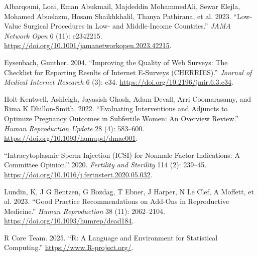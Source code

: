 \documentclass[
  letterpaper,
  DIV=11,
  numbers=noendperiod]{scrartcl}
\newlength{\cslhangindent}
\newenvironment{CSLReferences}[2] %
 {\begin{list}{}{%
  \setlength{\itemindent}{0pt}
  \setlength{\leftmargin}{0pt}
  \setlength{\parsep}{0pt}
  \ifodd #1
   \setlength{\leftmargin}{\cslhangindent}
   \setlength{\itemindent}{-1\cslhangindent}
  \fi
  \setlength{\itemsep}{#2\baselineskip}}}
 {\end{list}}
\begin{document}
\label{refs}
\begin{CSLReferences}{1}{0}
Albarqouni, Loai, Eman Abukmail, Majdeddin MohammedAli, Sewar Elejla,
Mohamed Abuelazm, Hosam Shaikhkhalil, Thanya Pathirana, et al. 2023.
{``Low-Value Surgical Procedures in Low- and Middle-Income Countries.''}
\emph{JAMA Network Open} 6 (11): e2342215.
\url{https://doi.org/10.1001/jamanetworkopen.2023.42215}.

Eysenbach, Gunther. 2004. {``Improving the Quality of Web Surveys: The
Checklist for Reporting Results of Internet E-Surveys (CHERRIES).''}
\emph{Journal of Medical Internet Research} 6 (3): e34.
\url{https://doi.org/10.2196/jmir.6.3.e34}.

Holt-Kentwell, Ashleigh, Jayasish Ghosh, Adam Devall, Arri Coomarasamy,
and Rima K Dhillon-Smith. 2022. {``Evaluating Interventions and Adjuncts
to Optimize Pregnancy Outcomes in Subfertile Women: An Overview
Review.''} \emph{Human Reproduction Update} 28 (4): 583--600.
\url{https://doi.org/10.1093/humupd/dmac001}.

{``Intracytoplasmic Sperm Injection (ICSI) for Non{\textendash}male
Factor Indications: A Committee Opinion.''} 2020. \emph{Fertility and
Sterility} 114 (2): 239--45.
\url{https://doi.org/10.1016/j.fertnstert.2020.05.032}.

Lundin, K, J G Bentzen, G Bozdag, T Ebner, J Harper, N Le Clef, A
Moffett, et al. 2023. {``Good Practice Recommendations on Add-Ons in
Reproductive Medicine.''} \emph{Human Reproduction} 38 (11): 2062--2104.
\url{https://doi.org/10.1093/humrep/dead184}.

R Core Team. 2025. {``R: A Language and Environment for Statistical
Computing.''} \url{https://www.R-project.org/}.

\end{CSLReferences}
\end{document}
